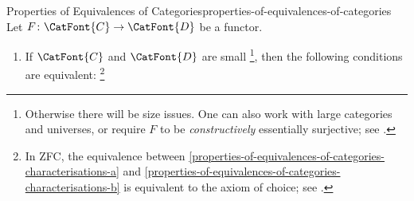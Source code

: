 \begin{proposition}{Properties of Equivalences of Categories}{properties-of-equivalences-of-categories}%
    Let $F\colon\CatFont{C}\to\CatFont{D}$ be a functor.
    \begin{enumerate}
        \item\label{properties-of-equivalences-of-categories-characterisations}If $\CatFont{C}$ and $\CatFont{D}$ are small%
            \footnote{%
                Otherwise there will be size issues. One can also work with large categories and universes, or require $F$ to be \emph{constructively} essentially surjective; see \cite{MSE1465107}.
            }, %
            then the following conditions are equivalent:%
            \footnote{%
                In ZFC, the equivalence between \cref{properties-of-equivalences-of-categories-characterisations-a} and \cref{properties-of-equivalences-of-categories-characterisations-b} is equivalent to the axiom of choice; see \cite{MO119454}.%

}
\end{enumerate}
\end{proposition}
